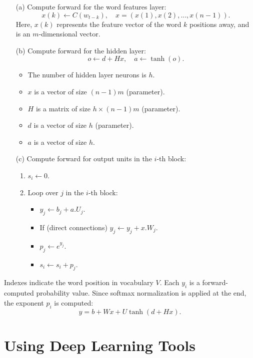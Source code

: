 \documentclass[11p,oneside]{book}
\begin{document}
\begin{enumerate}
    \item[(a)] Compute forward for the word features layer:
    \[
    x(k) \leftarrow C(w_{t-k}), \quad x = (x(1), x(2), ..., x(n-1)).
    \]
    Here, $x(k)$ represents the feature vector of the word $k$ positions away, and is an $m$-dimensional vector.

    \item[(b)] Compute forward for the hidden layer:
    \[
    o \leftarrow d + Hx, \quad a \leftarrow \tanh(o).
    \]
    \begin{itemize}
        \item The number of hidden layer neurons is $h$.
        \item $x$ is a vector of size $(n-1)m$ (parameter).
        \item $H$ is a matrix of size $h \times (n-1)m$ (parameter).
        \item $d$ is a vector of size $h$ (parameter).
        \item $a$ is a vector of size $h$.
    \end{itemize}

    \item[(c)] Compute forward for output units in the $i$-th block:
    \begin{enumerate}
        \item $s_i \leftarrow 0$.
        \item Loop over $j$ in the $i$-th block:
        \begin{itemize}
            \item $y_j \leftarrow b_j + a.U_j$.
            \item If (direct connections) $y_j \leftarrow y_j + x.W_j$.
            \item $p_j \leftarrow e^{y_j}$.
            \item $s_i \leftarrow s_i + p_j$.
        \end{itemize}
    \end{enumerate}
\end{enumerate}

Indexes indicate the word position in vocabulary $V$. Each $y_i$ is a forward-computed probability value. Since softmax normalization is applied at the end, the exponent $p_i$ is computed:
\[
y = b + Wx + U\tanh(d + Hx).
\]

\section*{Using Deep Learning Tools}
\end{document}
